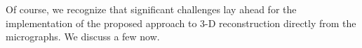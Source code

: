 \documentclass[english,11pt]{article}
\newcommand{\1}{\mathbf{1}}
\newcommand{\TODO}[1]{{\color{red}{[#1]}}}
\numberwithin{equation}{section}
\theoremstyle{plain}
\theoremstyle{definition}
\theoremstyle{remark}
\theoremstyle{plain}
\theoremstyle{remark}
\theoremstyle{plain}
\theoremstyle{plain}
\begin{document}
%
%



Of course, we recognize that significant challenges lay ahead for the implementation of the proposed approach to 3-D reconstruction directly from the micrographs. We discuss a few now.
\end{document}
